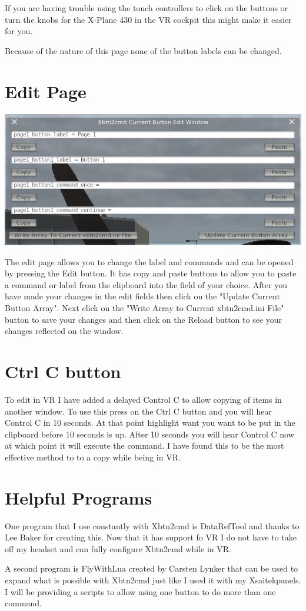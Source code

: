 \documentclass[11pt,parskip=half,a4paper]{scrartcl}
\begin{document}
If you are having trouble using the touch controllers to click on the buttons or turn the knobs for the X-Plane 430 in the VR cockpit this might make it easier for you. \newline

Because of the nature of this page none of the button labels can be changed.

\newpage
\section{Edit Page}

\begin{center}
\includegraphics[width=15cm]{Xbtn2cmd_Edit_Page.png}
\end{center}

The edit page allows you to change the label and commands and can be opened by pressing the Edit button. It has copy and paste buttons to allow you to paste a command or label from the clipboard into the field of your choice. After you have made your changes in the edit fields then click on the "Update Current Button Array". Next click on the "Write Array to Current xbtn2cmd.ini File" button to save your changes and then click on the Reload button to see your changes reflected on the window. 

\section{Ctrl C button}

To edit in VR I have added a delayed Control C to allow copying of items in another window. To use this press on the Ctrl C button and you will hear Control C in 10 seconds. At that point highlight want you want to be put in the clipboard before 10 seconds is up. After 10 seconds you will hear Control C now at which point it will execute the command. I have found this to be the most effective method to to a copy while being in VR.

\newpage
\section{Helpful Programs}

One program that I use constantly with Xbtn2cmd is DataRefTool and thanks to Lee Baker for creating this. Now that it has support fo VR I do not have to take off my headset and can fully configure Xbtn2cmd while in VR.

A second program is FlyWithLua created by Carsten Lynker that can be used to expand what is possible with Xbtn2cmd just like I used it with my Xsaitekpanels. I will be providing a scripts to allow using one button to do more than one command. 
\end{document}
